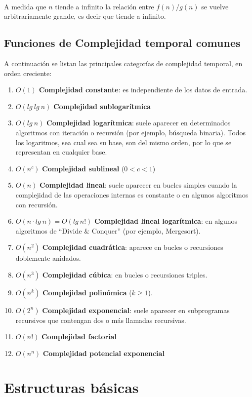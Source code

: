 ~

A medida que $n$ tiende a infinito la relaci\'on entre $f(n)/g(n)$ se vuelve arbitrariamente grande, es decir que tiende a infinito.

\subsection{Funciones de Complejidad temporal comunes}
A continuaci\'on se listan las principales categor\'ias de complejidad temporal, en orden creciente:
\begin{enumerate}
 \item $O(1)$ \textbf{Complejidad constante}: es independiente de los datos de entrada.
 \item $O(lg\ lg\ n)$ \textbf{Complejidad sublogar\'itmica}
 \item $O(lg\ n)$ \textbf{Complejidad logar\'itmica}: suele aparecer en determinados algoritmos con iteraci\'on o recursi\'on (por ejemplo, b\'usqueda binaria). Todos los logaritmos, sea cual sea su base, son del mismo orden, por lo que se representan en cualquier base.
 \item $O(n^c)$ \textbf{Complejidad sublineal} ($0 < c < 1$)
 \item $O(n)$ \textbf{Complejidad lineal}: suele aparecer en bucles simples cuando la complejidad de las operaciones internas es constante o en algunos algoritmos con recursi\'on.
 \item $O(n \cdot lg\ n) = O(lg\ n!)$ \textbf{Complejidad lineal logar\'itmica}: en algunos algoritmos de ``Divide \& Conquer'' (por ejemplo, Mergesort).
 \item $O(n^2)$ \textbf{Complejidad cuadr\'atica}: aparece en bucles o recursiones doblemente anidados.
 \item $O(n^3)$ \textbf{Complejidad c\'ubica}: en bucles o recursiones triples.
 \item $O(n^k)$ \textbf{Complejidad polin\'omica} ($k \geq 1$).
 \item $O(2^n)$ \textbf{Complejidad exponencial}: suele aparecer en subprogramas recursivos que contengan dos o m\'as llamadas recursivas.
 \item $O(n!)$ \textbf{Complejidad factorial}
 \item $O(n^n)$ \textbf{Complejidad potencial exponencial}
\end{enumerate}

\newpage
\section{Estructuras b\'asicas}
